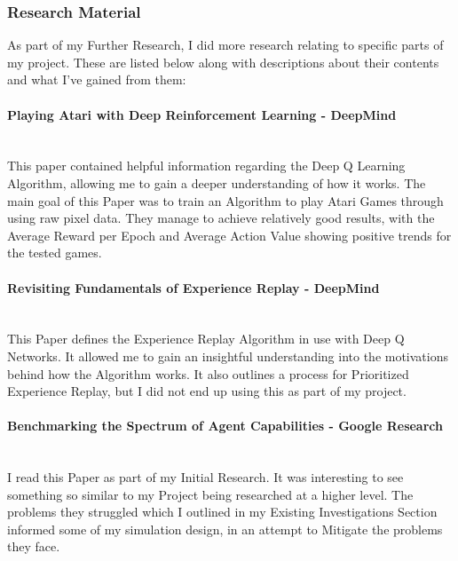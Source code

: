 \begin{flushleft}
\begin{itemize}
                \end{itemize}
            \subsubsection{Research Material}
                As part of my Further Research, I did more research relating to specific parts of my project. These are listed below along with 
                descriptions about their contents and what I've gained from them:
                
                \paragraph*{Playing Atari with Deep Reinforcement Learning - DeepMind} \mbox{} \\
                    This paper contained helpful information regarding the Deep Q Learning Algorithm, allowing me to gain a deeper understanding
                    of how it works. The main goal of this Paper was to train an Algorithm to play Atari Games through using raw pixel data. They
                    manage to achieve relatively good results, with the Average Reward per Epoch and Average Action Value showing positive
                    trends for the tested games.

                \paragraph*{Revisiting Fundamentals of Experience Replay - DeepMind} \mbox{} \\        
                    This Paper defines the Experience Replay Algorithm in use with Deep Q Networks. It allowed me to gain an insightful understanding
                    into the motivations behind how the Algorithm works. It also outlines a process for Prioritized Experience Replay, but I did not
                    end up using this as part of my project.

                \paragraph*{Benchmarking the Spectrum of Agent Capabilities - Google Research} \mbox{} \\
                    I read this Paper as part of my Initial Research. It was interesting to see something so similar to my Project being researched
                    at a higher level. The problems they struggled which I outlined in my Existing Investigations Section informed some of my simulation
                    design, in an attempt to Mitigate the problems they face.


\end{flushleft}
